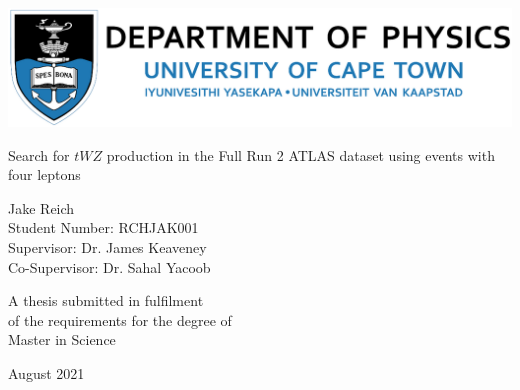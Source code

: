 \documentclass[hidelinks,11pt]{report}
\begin{document}
\thispagestyle{empty}
\begin{center}
	\begin{minipage}{0.75\linewidth}
		\centering
		\includegraphics[width=1\linewidth]{deptPhysics.eps}\\
		\par
		\vspace{2cm}
		{{\Large Search for $tWZ$ production in the Full Run 2 ATLAS dataset using events with four leptons\par}}
		\vspace{2cm}
		{\Large Jake Reich\\Student Number: RCHJAK001 \\Supervisor: Dr. James Keaveney \\ Co-Supervisor: Dr. Sahal Yacoob\par}
		\vspace{2cm}
		{\Large A thesis submitted in fulfilment\\ of the requirements for the degree of\\ Master in Science\par}
		\vspace{4cm}
		{\Large August 2021}
	\end{minipage}
\end{center}
\end{document}
